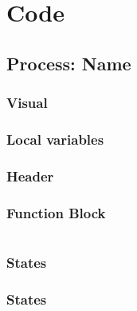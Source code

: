 \chapter{Code} 

\section{Process: Name}

\subsection{Visual}

\subsection{Local variables}

\subsection{Header}

\subsection{Function Block}

\begin{verbatim}

\end{verbatim}

\subsection{States}

\subsection{States}
